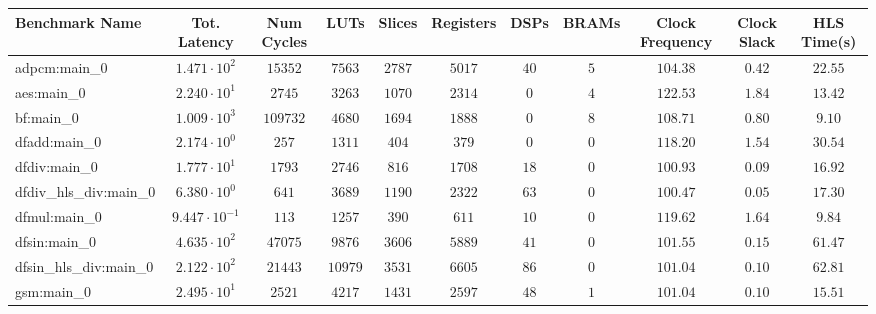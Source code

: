 \begin{tabular}{|l|c|c|c|c|c|c|c|c|c|c|}
\hline
Benchmark Name          & Tot. Latency            & Num Cycles & LUTs      & Slices    & Registers & DSPs    & BRAMs  & Clock Frequency & Clock Slack & HLS Time(s) \\
\hline
adpcm:main\_0           & $ 1.471 \cdot 10^{2}  $ & $ 15352  $ & $ 7563  $ & $ 2787  $ & $ 5017  $ & $ 40  $ & $ 5  $ & $ 104.38      $ & $ 0.42    $ & $ 22.55   $ \\
aes:main\_0             & $ 2.240 \cdot 10^{1}  $ & $ 2745   $ & $ 3263  $ & $ 1070  $ & $ 2314  $ & $ 0   $ & $ 4  $ & $ 122.53      $ & $ 1.84    $ & $ 13.42   $ \\
bf:main\_0              & $ 1.009 \cdot 10^{3}  $ & $ 109732 $ & $ 4680  $ & $ 1694  $ & $ 1888  $ & $ 0   $ & $ 8  $ & $ 108.71      $ & $ 0.80    $ & $ 9.10    $ \\
dfadd:main\_0           & $ 2.174 \cdot 10^{0}  $ & $ 257    $ & $ 1311  $ & $ 404   $ & $ 379   $ & $ 0   $ & $ 0  $ & $ 118.20      $ & $ 1.54    $ & $ 30.54   $ \\
dfdiv:main\_0           & $ 1.777 \cdot 10^{1}  $ & $ 1793   $ & $ 2746  $ & $ 816   $ & $ 1708  $ & $ 18  $ & $ 0  $ & $ 100.93      $ & $ 0.09    $ & $ 16.92   $ \\
dfdiv\_hls\_div:main\_0 & $ 6.380 \cdot 10^{0}  $ & $ 641    $ & $ 3689  $ & $ 1190  $ & $ 2322  $ & $ 63  $ & $ 0  $ & $ 100.47      $ & $ 0.05    $ & $ 17.30   $ \\
dfmul:main\_0           & $ 9.447 \cdot 10^{-1} $ & $ 113    $ & $ 1257  $ & $ 390   $ & $ 611   $ & $ 10  $ & $ 0  $ & $ 119.62      $ & $ 1.64    $ & $ 9.84    $ \\
dfsin:main\_0           & $ 4.635 \cdot 10^{2}  $ & $ 47075  $ & $ 9876  $ & $ 3606  $ & $ 5889  $ & $ 41  $ & $ 0  $ & $ 101.55      $ & $ 0.15    $ & $ 61.47   $ \\
dfsin\_hls\_div:main\_0 & $ 2.122 \cdot 10^{2}  $ & $ 21443  $ & $ 10979 $ & $ 3531  $ & $ 6605  $ & $ 86  $ & $ 0  $ & $ 101.04      $ & $ 0.10    $ & $ 62.81   $ \\
gsm:main\_0             & $ 2.495 \cdot 10^{1}  $ & $ 2521   $ & $ 4217  $ & $ 1431  $ & $ 2597  $ & $ 48  $ & $ 1  $ & $ 101.04      $ & $ 0.10    $ & $ 15.51   $ \\

\end{tabular}
